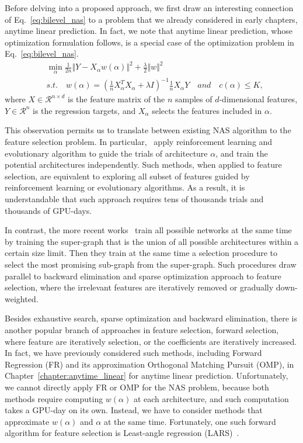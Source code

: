 Before delving into a proposed approach, we first draw an interesting connection of Eq.~\ref{eq:bilevel_nas}
to a problem that we already considered in early chapters, anytime linear prediction.
In fact, we note that anytime linear prediction, whose optimization formulation follows, is a special case
of the optimization problem in Eq.~\ref{eq:bilevel_nas}. 
\begin{align}
&\min _{\alpha} \frac{1}{2n} \Vert Y - X_{\alpha} w(\alpha) \Vert ^2 + \frac{\lambda}{2} \Vert w \Vert ^2 \\
&s.t. \quad w(\alpha) = (\frac{1}{n}X_{\alpha}^TX_{\alpha} + \lambda I)^{-1} \frac{1}{n} X_{\alpha}Y 
\quad and \quad c(\alpha) \leq K,
\label{eq:bilevel_gomp}
\end{align}
where $X \in \mathcal{R}^{n \times d}$ is the feature matrix of the $n$ samples of $d$-dimensional features,
$Y \in \mathcal{R}^n$ is the regression targets, and $X_{\alpha}$ selects the features included in $\alpha$.

This observation permits us to translate between existing NAS algorithm to the feature selection problem. 
In particular,~\citep{nas,Real2017EvoNet} apply reinforcement learning and evolutionary algorithm to 
guide the trials of architecture $\alpha$, and train the potential architectures independently. 
Such methods, when applied to feature selection, are equivalent to exploring all subset of features 
guided by reinforcement learning or evolutionary algorithms. As a result, it is understandable that
such approach requires tens of thousands trials and thousands of GPU-days. 

In contrast, the more recent works~\citep{Pham2018EfficientNA,Liu2018DARTSDA} train all possible
networks at the same time by training the super-graph that is the union of all possible architectures within 
a certain size limit. 
Then they train at the same time a selection procedure to select the most promising 
sub-graph from the super-graph. Such procedures draw parallel to backward elimination 
and sparse optimization approach to feature selection, 
where the irrelevant features are iteratively removed or gradually down-weighted. 

Besides exhaustive search, sparse optimization and backward elimination, there is another popular branch of approaches 
in feature selection, forward selection, where feature are iteratively selection, or the coefficients are iteratively increased. 
In fact, we have previously considered such methods,
including Forward Regression (FR) and its approximation Orthogonal Matching Pursuit (OMP),
in Chapter~\ref{chapter:anytime_linear} for anytime linear prediction. Unfortunately, we cannot 
directly apply FR or OMP for the NAS problem, because both methods require computing 
$w(\alpha)$ at each architecture, and such computation takes a GPU-day on its own. Instead, we have
to consider methods that approximate $w(\alpha)$ and $\alpha$ at the same time. Fortunately,
one such forward algorithm for feature selection is Least-angle regression (LARS)~\citep{lars}. 

